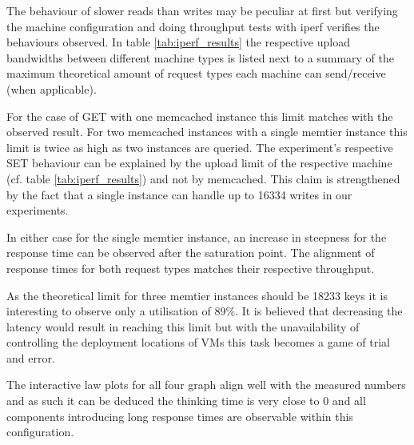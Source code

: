         The behaviour of slower reads than writes may be peculiar at first but verifying the machine configuration
        and doing throughput tests with iperf verifies the behaviours observed. In table \ref{tab:iperf_results} the
        respective upload bandwidths between different machine types is listed next to a summary of the maximum
        theoretical amount of request types each machine can send/receive (when applicable).

        For the case of GET with one memcached instance this limit matches with the observed result.  For two
        memcached instances with a single memtier instance this limit is twice as high as two instances are queried.
        The experiment's respective SET behaviour can be explained by the upload limit of the respective machine (cf.
        table \ref{tab:iperf_results}) and not by memcached. This claim is strengthened by the fact that a single
        instance can handle up to 16334 writes in our experiments.

        In either case for the single memtier instance, an increase in steepness for the response time can be
        observed after the saturation point. The alignment of response times for both request types matches their
        respective throughput.

        As the theoretical limit for three memtier instances should be 18233 keys it is interesting to observe only
        a utilisation of 89\%. It is believed that decreasing the latency would result in reaching this limit but
        with the unavailability of controlling the deployment locations of VMs this task becomes a game of trial and
        error.


        The interactive law plots for all four graph align well with the measured numbers and as such it can be
        deduced the thinking time is very close to 0 and all components introducing long response times are
        observable within this configuration.
